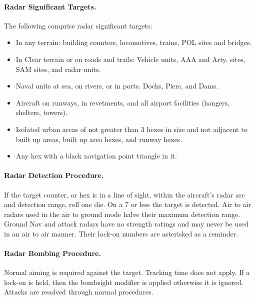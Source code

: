 \begin{advancedrules}
\paragraph{Radar Significant Targets.} The following comprise radar significant targets:

\begin{itemize}

    \item In any terrain: building counters, locomotives, trains, POL sites and bridges.

    \item In Clear terrain or on roads and trails: Vehicle units, AAA and Arty. sites, SAM sites, and radar units.

    \item Naval units at sea, on rivers, or in ports. Docks, Piers, and Dams.

    \item Aircraft on runways, in revetments, and all airport facilities (hangers, shelters, towers).

    \item Isolated urban areas of not greater than 3 hexes in size and not adjacent to built up areas, built up area hexes, and runway hexes.
    
    \item Any hex with a black navigation point triangle in it.

\end{itemize}

\paragraph{Radar Detection Procedure.} If the target counter, or hex is in a line of sight, within the aircraft's radar arc and detection range, roll one die. On a 7 or less the target is detected. Air to air radars used in the air to ground mode halve their maximum detection range. Ground Nav and attack radars have no strength ratings and may never be used in an air to air manner. Their lock-on numbers are asterisked as a reminder.

\paragraph{Radar Bombing Procedure.} Normal aiming is required against the target. Tracking time does not apply. If a lock-on is held, then the bombsight modifier is applied otherwise it is ignored. Attacks are resolved through normal procedures.


\end{advancedrules}
